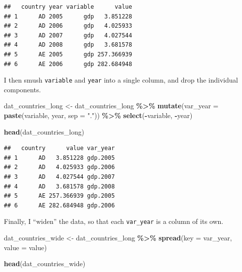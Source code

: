 \documentclass[
  12pt,
  oneside,openany]{book}
\newenvironment{Shaded}{\begin{snugshade}}{\end{snugshade}}
\newcommand{\DataTypeTok}[1]{\textcolor[rgb]{0.13,0.29,0.53}{#1}}
\newcommand{\KeywordTok}[1]{\textcolor[rgb]{0.13,0.29,0.53}{\textbf{#1}}}
\newcommand{\NormalTok}[1]{#1}
\newcommand{\OperatorTok}[1]{\textcolor[rgb]{0.81,0.36,0.00}{\textbf{#1}}}
\newcommand{\StringTok}[1]{\textcolor[rgb]{0.31,0.60,0.02}{#1}}
\begin{document}
\begin{verbatim}
##   country year variable      value
## 1      AD 2005      gdp   3.851228
## 2      AD 2006      gdp   4.025933
## 3      AD 2007      gdp   4.027544
## 4      AD 2008      gdp   3.681578
## 5      AE 2005      gdp 257.366939
## 6      AE 2006      gdp 282.684948
\end{verbatim}

I then smush \texttt{variable} and \texttt{year} into a single column, and drop the individual components.

\begin{Shaded}
\begin{Highlighting}[]
\NormalTok{dat\_countries\_long <{-}}\StringTok{ }\NormalTok{dat\_countries\_long }\OperatorTok{\%>\%}
\StringTok{  }\KeywordTok{mutate}\NormalTok{(}\DataTypeTok{var\_year =} \KeywordTok{paste}\NormalTok{(variable, year, }\DataTypeTok{sep =} \StringTok{"."}\NormalTok{)) }\OperatorTok{\%>\%}
\StringTok{  }\KeywordTok{select}\NormalTok{(}\OperatorTok{{-}}\NormalTok{variable, }\OperatorTok{{-}}\NormalTok{year)}

\KeywordTok{head}\NormalTok{(dat\_countries\_long)}
\end{Highlighting}
\end{Shaded}

\begin{verbatim}
##   country      value var_year
## 1      AD   3.851228 gdp.2005
## 2      AD   4.025933 gdp.2006
## 3      AD   4.027544 gdp.2007
## 4      AD   3.681578 gdp.2008
## 5      AE 257.366939 gdp.2005
## 6      AE 282.684948 gdp.2006
\end{verbatim}

Finally, I ``widen'' the data, so that each \texttt{var\_year} is a column of its own.

\begin{Shaded}
\begin{Highlighting}[]
\NormalTok{dat\_countries\_wide <{-}}\StringTok{ }\NormalTok{dat\_countries\_long }\OperatorTok{\%>\%}
\StringTok{  }\KeywordTok{spread}\NormalTok{(}\DataTypeTok{key =}\NormalTok{ var\_year, }\DataTypeTok{value =}\NormalTok{ value)}

\KeywordTok{head}\NormalTok{(dat\_countries\_wide)}
\end{Highlighting}
\end{Shaded}
\end{document}
